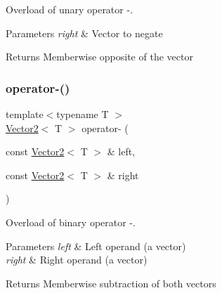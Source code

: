 Overload of unary operator -\/. 


\begin{DoxyParams}{Parameters}
{\em right} & Vector to negate\\
\hline
\end{DoxyParams}
\begin{DoxyReturn}{Returns}
Memberwise opposite of the vector \begin{DoxyVerb}\end{DoxyVerb}
 
\end{DoxyReturn}
\mbox{\label{classsf_1_1_vector2_ad027adae53ec547a86c20deeb05c9e85}} 
\subsubsection{\texorpdfstring{operator-\/()}{operator-()}\hspace{0.1cm}{\footnotesize\ttfamily [2/2]}}
{\footnotesize\ttfamily template$<$typename T $>$ \\
\mbox{\hyperlink{classsf_1_1_vector2}{Vector2}}$<$ T $>$ operator-\/ (\begin{DoxyParamCaption}\item[{const \mbox{\hyperlink{classsf_1_1_vector2}{Vector2}}$<$ T $>$ \&}]{left,  }\item[{const \mbox{\hyperlink{classsf_1_1_vector2}{Vector2}}$<$ T $>$ \&}]{right }\end{DoxyParamCaption})\hspace{0.3cm}{\ttfamily [related]}}



Overload of binary operator -\/. 


\begin{DoxyParams}{Parameters}
{\em left} & Left operand (a vector) \\
\hline
{\em right} & Right operand (a vector)\\
\hline
\end{DoxyParams}
\begin{DoxyReturn}{Returns}
Memberwise subtraction of both vectors \begin{DoxyVerb}\end{DoxyVerb}
 
\end{DoxyReturn}
\mbox{\label{classsf_1_1_vector2_a30a5a12ad03c9a3a982a0a313bf84e6f}} 
